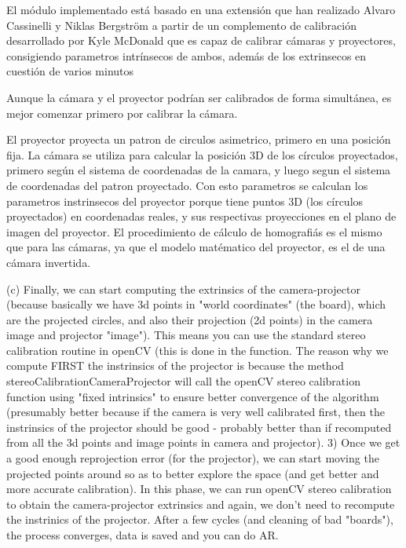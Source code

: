 El módulo implementado está basado en una extensión que han realizado Alvaro Cassinelli y Niklas Bergström a partir de un complemento de calibración desarrollado por Kyle McDonald que es capaz de calibrar cámaras y proyectores, consigiendo parametros intrínsecos de ambos, además de los extrinsecos en cuestión de varios minutos 

Aunque la cámara y el proyector podrían ser calibrados de forma simultánea, es mejor comenzar primero por calibrar la cámara.

El proyector proyecta un patron de circulos asimetrico, primero en una posición fija. La cámara se utiliza para calcular la posición 3D de los círculos proyectados, primero según el sistema de coordenadas de la camara, y luego segun el sistema de coordenadas del patron proyectado. Con esto parametros se calculan los parametros instrinsecos del proyector porque tiene puntos 3D (los círculos proyectados) en coordenadas reales, y sus respectivas proyecciones en el plano de imagen del proyector. El procedimiento de cálculo de homografiás es el mismo que para las cámaras, ya que el modelo matématico del proyector, es el de una cámara invertida. 


(c) Finally, we can start computing the extrinsics of the camera-projector (because basically we have 3d points in "world coordinates" (the board), which are the projected circles, and also their projection (2d points) in the camera image and projector "image"). This means you can use the standard stereo calibration routine in openCV (this is done in the function. The reason why we compute FIRST the instrinsics of the projector is because the method stereoCalibrationCameraProjector will call the openCV stereo calibration function using "fixed intrinsics" to ensure better convergence of the algorithm (presumably better because if the camera is very well calibrated first, then the instrinsics of the projector should be good - probably better than if recomputed from all the 3d points and image points in camera and projector). 
3) Once we get a good enough reprojection error (for the projector), we can start moving the projected points around so as to better explore the space (and get better and more accurate calibration). In this phase, we can run openCV stereo calibration to obtain the camera-projector extrinsics and again, we don't need to recompute the instrinics of the projector. After a few cycles (and cleaning of bad "boards"), the process converges, data is saved and you can do AR. 




